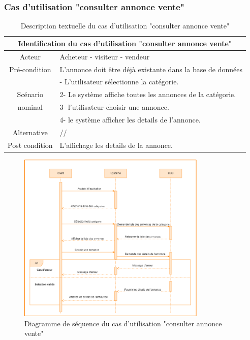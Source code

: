 \documentclass[edit,12pt,a4paper,ChapStyle,oneside,doubleinterligne]{report}
\begin{document}
\subsubsection{Cas d'utilisation "consulter annonce vente"}
\begin{table}[h!]
    \centering
    \begin{tabular}{|c|m{10cm}|}
    \hline
         \multicolumn{2}{|c|}{Identification du cas d'utilisation "consulter annonce vente" }\\
         \hline
         Acteur & Acheteur - visiteur - vendeur\\
         \hline
         Pré-condition & L’annonce doit être déjà existante dans la base de données\\
         \hline
          & - L'utilisateur sélectionne la catégorie.\\
          Scénario& 2- Le système affiche toutes les annonces de la catégorie.\\
          nominal& 3- l'utilisateur choisir une annonce.\\
          & 4- le système afficher les details de l'annonce.\\
         \hline
         Alternative  & // \\
         \hline
         Post condition &  L’affichage les details de la annonce.\\
         \hline
    \end{tabular}
    \caption{Description textuelle du cas d'utilisation "consulter annonce vente" }
    \label{tab:cas 7c}
\end{table}
\begin{figure}[h!]\label{fig:Diagramme cas 7c}
\centering
\includegraphics[width=0.8\textwidth]{images/consulter une annonce.png}
\caption{Diagramme de séquence du cas d'utilisation "consulter annonce vente"}
\end{figure}
\end{document}
